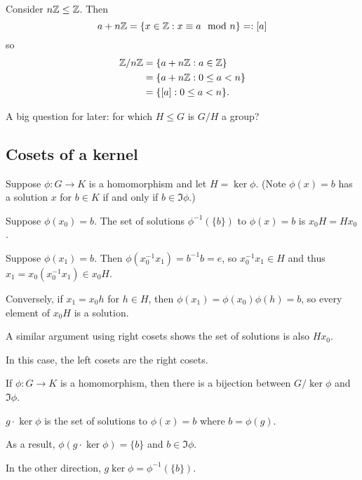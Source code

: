 \documentclass[12pt,letterpaper]{report}
\begin{document}
\begin{ex}
  Consider $n\mathbb{Z} \leq \mathbb{Z}$.
  Then
  \[ a + n\mathbb{Z} = \{x \in \mathbb{Z} : x \equiv a \mod{n}\} =: [a] \]
  so
  \begin{align*}
    \mathbb{Z}/{n}\mathbb{Z} &= \{a + n\mathbb{Z} : a \in \mathbb{Z}\} \\
    &= \{a + n\mathbb{Z} : 0 \leq a < n\} \\
    &= \{[a] : 0 \leq a < n\}.
  \end{align*}
\end{ex}

A big question for later: for which $H \leq G$ is $G/H$ a group?

\pagebreak
\subsection{Cosets of a kernel}

Suppose $\phi \colon G \to K$ is a homomorphism and let $H = \ker \phi$.
(Note $\phi(x) = b$ has a solution $x$ for $b \in K$ if and only if $b \in \Im \phi$.)

\begin{lem}{}{}
  Suppose $\phi(x_0) = b$.
  The set of solutions $\phi^{-1}(\{b\})$ to $\phi(x) = b$ is $x_0 H = H x_0$.
\end{lem}

\begin{thmproof}
  Suppose $\phi(x_1) = b$.
  Then $\phi(x_0^{-1} x_1) = b^{-1}b = e$, so $x_0^{-1}x_1 \in H$ and thus
  $x_1 = x_0(x_0^{-1}x_1) \in x_0 H$.

  Conversely, if $x_1 = x_0 h$ for $h \in H$, then $\phi(x_1) = \phi(x_0)\phi(h) = b$, so every
  element of $x_0 H$ is a solution.

  A similar argument using right cosets shows the set of solutions is also $Hx_0$.
\end{thmproof}

In this case, the left cosets are the right cosets.

\begin{prop}{}{}
  If $\phi \colon G \to K$ is a homomorphism, then there is a bijection between $G / \ker\phi$ and
  $\Im \phi$.
\end{prop}

\begin{thmproof}
  $g \cdot \ker\phi$ is the set of solutions to $\phi(x) = b$ where $b = \phi(g)$.

  As a result, $\phi(g \cdot \ker\phi) = \{b\}$ and $b \in \Im \phi$.

  In the other direction, $g \ker\phi = \phi^{-1}(\{b\})$.
\end{thmproof}
\end{document}
